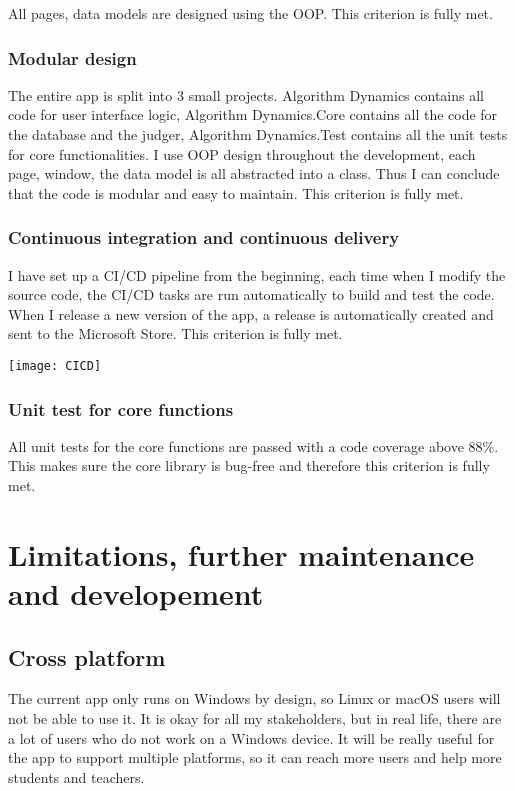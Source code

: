 \documentclass[report.tex]{subfiles}
\begin{document}
All pages, data models are designed using the OOP. This criterion is fully met.

\subsubsection{Modular design}

The entire app is split into 3 small projects. Algorithm Dynamics contains all code for user interface logic, Algorithm Dynamics.Core contains all the code for the database and the judger, Algorithm Dynamics.Test contains all the unit tests for core functionalities. I use OOP design throughout the development, each page, window, the data model is all abstracted into a class. Thus I can conclude that the code is modular and easy to maintain. This criterion is fully met.

\subsubsection{Continuous integration and continuous delivery}

I have set up a CI/CD pipeline from the beginning, each time when I modify the source code, the CI/CD tasks are run automatically to build and test the code. When I release a new version of the app, a release is automatically created and sent to the Microsoft Store. This criterion is fully met.

\texttt{[image: CICD]}

\subsubsection{Unit test for core functions}

All unit tests for the core functions are passed with a code coverage above 88\%. This makes sure the core library is bug-free and therefore this criterion is fully met.

\section{Limitations, further maintenance and developement}

\subsection{Cross platform}

The current app only runs on Windows by design, so Linux or macOS users will not be able to use it. It is okay for all my stakeholders, but in real life, there are a lot of users who do not work on a Windows device. It will be really useful for the app to support multiple platforms, so it can reach more users and help more students and teachers.
\end{document}
